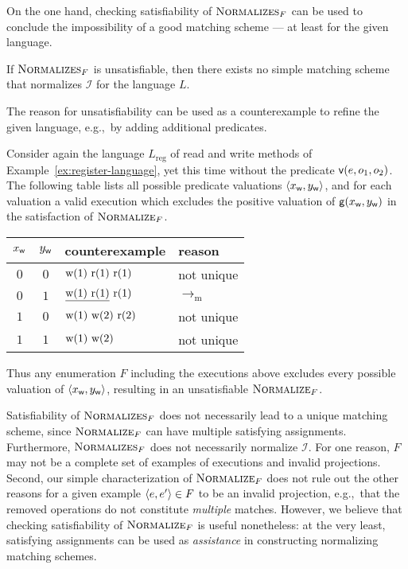 On the one hand, checking satisfiability of $\textsc{Normalizes}_F$ can be used
to conclude the impossibility of a good matching scheme — at least for the
given language.

\begin{lemma}

  If $\textsc{Normalizes}_F$ is unsatisfiable, then there exists no simple
  matching scheme that normalizes $\mathcal{I}$ for the language $L$.

\end{lemma}

The reason for unsatisfiability can be used as a counterexample to refine the
given language, e.g.,~by adding additional predicates.

\begin{example}

  Consider again the language $L_\mathrm{reg}$ of read and write methods of
  Example~\ref{ex:register-language}, yet this time without the predicate ${\sf
  v}(e,o_1,o_2)$. The following table lists all possible predicate valuations
  ${\left\langle{x_{\sf w}, y_{\sf w}}\right\rangle}$, and for each valuation a valid execution which
  excludes the positive valuation of ${\sf g}(x_{\sf w}, y_{\sf w})$ in the
  satisfaction of $\textsc{Normalize}_F$.
  \begin{center}
    \begin{tabular}{cc|ll}
      $x_{\sf w}$ & $y_{\sf w}$ & counterexample & reason \\
      \hline
      $0$ & $0$ & ${\rm w}(1)\ {\rm r}(1)\ {\rm r}(1)$ & not unique \\
      $0$ & $1$ & $\underline{{\rm w}(1)\ {\rm r}(1)}\ {\rm r}(1)$ & $\to_\mathrm{m}$ \\
      $1$ & $0$ & ${\rm w}(1)\ {\rm w}(2)\ {\rm r}(2)$ & not unique \\
      $1$ & $1$ & ${\rm w}(1)\ {\rm w}(2)$ & not unique \\
    \end{tabular}
  \end{center}
  Thus any enumeration $F$ including the executions above excludes every
  possible valuation of ${\left\langle{x_{\sf w}, y_{\sf w}}\right\rangle}$, resulting in an
  unsatisfiable $\textsc{Normalize}_F$.

\end{example}

Satisfiability of $\textsc{Normalizes}_F$ does not
necessarily lead to a unique matching scheme, since $\textsc{Normalize}_F$ can
have multiple satisfying assignments. Furthermore, $\textsc{Normalizes}_F$ does
not necessarily normalize $\mathcal{I}$. For one reason, $F$ may not be a
complete set of examples of executions and invalid projections. Second, our
simple characterization of $\textsc{Normalize}_F$ does not rule out the other
reasons for a given example ${\left\langle{e,e'}\right\rangle} \in F$ to be an invalid projection,
e.g.,~that the removed operations do not constitute \emph{multiple} matches.
However, we believe that checking satisfiability of $\textsc{Normalize}_F$ is
useful nonetheless: at the very least, satisfying assignments can be used as
\emph{assistance} in constructing normalizing matching schemes.
